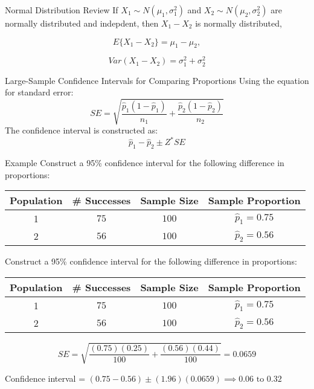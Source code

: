 \documentclass{beamer}
\begin{document}
\begin{frame}{Normal Distribution Review}
	If $X_1 \sim N(\mu_1, \sigma_1^2)$ and $X_2 \sim N(\mu_2, \sigma_2^2)$ are normally distributed and indepdent, then $X_1 - X_2$ is normally distributed,

	\[ E\{X_1 - X_2\} = \mu_1 - \mu_2, \]

	\[ Var(X_1 - X_2) = \sigma_1^2 + \sigma_2^2 \]
\end{frame}

\begin{frame}{Large-Sample Confidence Intervals for Comparing Proportions}
	Using the equation for standard error:
	\[ 
		SE = \sqrt{\frac{\hat{p}_1(1-\hat{p}_1)}{n_1} + \frac{\hat{p}_2(1-\hat{p}_2)}{n_2}} 
	\] 
	The confidence interval is constructed as:
	\[ 
		\hat{p}_1 - \hat{p}_2 \pm Z^* SE 
	\] 
\end{frame}

\begin{frame}{Example}
	Construct a 95\% confidence interval for the following difference in proportions:
	\begin{center}
		\begin{tabular}{|c|c|c|c|}
			\hline
			\textbf{Population} & \textbf{\# Successes} & \textbf{Sample Size} & \textbf{Sample Proportion} \\ [0.5ex]
			\hline
			1          & $75$         & $100$       & $\hat{p}_1=0.75$  \\
			\hline
			2          & $56$         & $100$       & $\hat{p}_2=0.56$  \\
			\hline
		\end{tabular}
	\end{center}
\end{frame}

\frame

\begin{frame}	
	Construct a 95\% confidence interval for the following difference in proportions:
	
	\begin{center}
		\begin{tabular}{|c|c|c|c|}
			\hline
			\textbf{Population} & \textbf{\# Successes} & \textbf{Sample Size} & \textbf{Sample Proportion} \\ [0.5ex]
			\hline
			1          & $75$         & $100$       & $\hat{p}_1=0.75$  \\
			\hline
			2          & $56$         & $100$       & $\hat{p}_2=0.56$  \\
			\hline
		\end{tabular}
	\end{center}

	\[ 
		SE=\sqrt{\frac{(0.75)(0.25)}{100}+\frac{(0.56)(0.44)}{100}}=0.0659
	\]

	Confidence interval = $(0.75-0.56)\pm(1.96)(0.0659) \implies 0.06 \text{ to } 0.32$
\end{frame}
\end{document}
